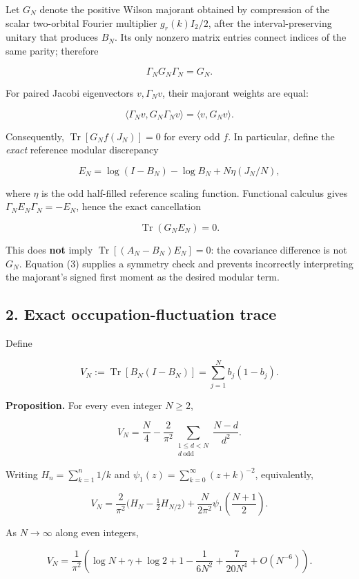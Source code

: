 \documentclass[
  10pt,
  a4paper,
]{article}
\begin{document}
Let \(G_N\) denote the positive Wilson majorant obtained by compression of the scalar two-orbital Fourier multiplier \(g_r(k)I_2/2\), after the interval-preserving unitary that produces \(B_N\). Its only nonzero matrix entries connect indices of the same parity; therefore

\[
\boxed{\Gamma_N G_N\Gamma_N=G_N.}\tag{2}
\]

For paired Jacobi eigenvectors \(v,\Gamma_Nv\), their majorant weights are equal:

\[
\langle\Gamma_Nv,G_N\Gamma_Nv\rangle=\langle v,G_Nv\rangle.
\]

Consequently, \(\operatorname{Tr}[G_N f(J_N)]=0\) for every odd \(f\). In particular, define the \emph{exact} reference modular discrepancy

\[
 E_N=\log(I-B_N)-\log B_N+N\eta(J_N/N),
\]

where \(\eta\) is the odd half-filled reference scaling function. Functional calculus gives \(\Gamma_NE_N\Gamma_N=-E_N\), hence the exact cancellation

\[
\boxed{\operatorname{Tr}(G_NE_N)=0.}\tag{3}
\]

This does \textbf{not} imply \(\operatorname{Tr}[(A_N-B_N)E_N]=0\): the covariance difference is not \(G_N\). Equation (3) supplies a symmetry check and prevents incorrectly interpreting the majorant's signed first moment as the desired modular term.

\subsection{2. Exact occupation-fluctuation trace}\label{exact-occupation-fluctuation-trace}

Define

\[
V_N:=\operatorname{Tr}[B_N(I-B_N)]=\sum_{j=1}^N b_j(1-b_j).
\]

\textbf{Proposition.} For every even integer \(N\ge2\),

\[
\boxed{V_N=\frac{N}{4}-\frac{2}{\pi^2}
 \sum_{\substack{1\le d<N\\d\ \mathrm{odd}}}\frac{N-d}{d^2}.}\tag{4}
\]

Writing \(H_n=\sum_{k=1}^n1/k\) and \(\psi_1(z)=\sum_{k=0}^\infty(z+k)^{-2}\), equivalently,

\[
\boxed{V_N=\frac2{\pi^2}\Big(H_N-\tfrac12 H_{N/2}\Big)
+\frac{N}{2\pi^2}\psi_1\!\left(\frac{N+1}{2}\right).}\tag{5}
\]

As \(N\to\infty\) along even integers,

\[
\boxed{V_N=\frac1{\pi^2}\left(\log N+\gamma+\log2+1
-\frac{1}{6N^2}+\frac{7}{20N^4}+O(N^{-6})\right).}\tag{6}
\]
\end{document}
